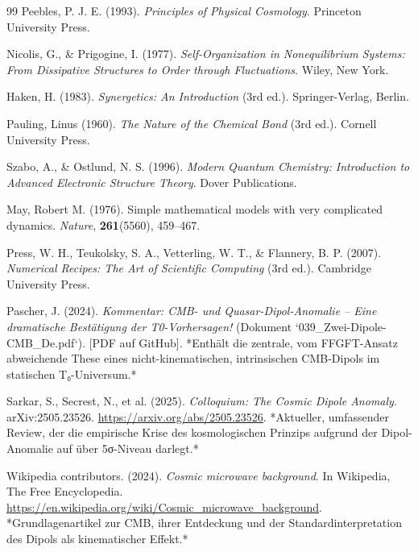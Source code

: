 \begin{thebibliography}{99}
		Peebles, P. J. E. (1993). \textit{Principles of Physical Cosmology}. 
		Princeton University Press.
		
		Nicolis, G., \& Prigogine, I. (1977). \textit{Self-Organization in Nonequilibrium Systems: From Dissipative Structures to Order through Fluctuations}. 
		Wiley, New York.
		
		Haken, H. (1983). \textit{Synergetics: An Introduction} (3rd ed.). 
		Springer-Verlag, Berlin.
		
		Pauling, Linus (1960). \textit{The Nature of the Chemical Bond} (3rd ed.). 
		Cornell University Press.
		
		Szabo, A., \& Ostlund, N. S. (1996). \textit{Modern Quantum Chemistry: Introduction to Advanced Electronic Structure Theory}. 
		Dover Publications.
		
		May, Robert M. (1976). Simple mathematical models with very complicated dynamics. 
		\textit{Nature}, \textbf{261}(5560), 459--467.
		
		Press, W. H., Teukolsky, S. A., Vetterling, W. T., \& Flannery, B. P. (2007). \textit{Numerical Recipes: The Art of Scientific Computing} (3rd ed.). 
		Cambridge University Press.
		
		Pascher, J. (2024). \textit{Kommentar: CMB- und Quasar-Dipol-Anomalie – Eine dramatische Bestätigung der T0-Vorhersagen!} (Dokument `039\_Zwei-Dipole-CMB\_De.pdf`).
		[PDF auf GitHub].
		*Enthält die zentrale, vom FFGFT-Ansatz abweichende These eines nicht-kinematischen, intrinsischen CMB-Dipols im statischen T₀-Universum.*
		
		Sarkar, S., Secrest, N., et al. (2025). \textit{Colloquium: The Cosmic Dipole Anomaly}. 
		arXiv:2505.23526.
		\href{https://arxiv.org/abs/2505.23526}{https://arxiv.org/abs/2505.23526}.
		*Aktueller, umfassender Review, der die empirische Krise des kosmologischen Prinzips aufgrund der Dipol-Anomalie auf über 5σ-Niveau darlegt.*
		
		Wikipedia contributors. (2024). \textit{Cosmic microwave background}. 
		In Wikipedia, The Free Encyclopedia.
		\href{https://en.wikipedia.org/wiki/Cosmic_microwave_background}{https://en.wikipedia.org/wiki/Cosmic\_microwave\_background}.
		*Grundlagenartikel zur CMB, ihrer Entdeckung und der Standardinterpretation des Dipols als kinematischer Effekt.*
		

\end{thebibliography}
